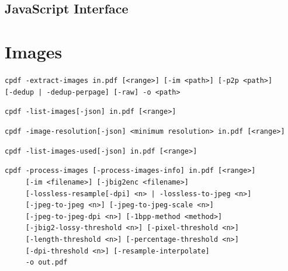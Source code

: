 \documentclass{book}
\begin{document}
\begin{jscpdflib}
\clearpage
\section*{JavaScript Interface}
\begin{small}\tt

\end{small}
\end{jscpdflib}

\chapter{Images}\label{chap:13}
\begin{framed}
\noindent\small\verb!cpdf -extract-images in.pdf [<range>] [-im <path>] [-p2p <path>]!
\noindent\small\verb!     [-dedup | -dedup-perpage] [-raw] -o <path>!

\vspace{1.5mm}
\noindent\small\verb!cpdf -list-images[-json] in.pdf [<range>]!

\vspace{1.5mm}
\noindent\small\verb!cpdf -image-resolution[-json] <minimum resolution> in.pdf [<range>]!

\vspace{1.5mm}
\noindent\small\verb!cpdf -list-images-used[-json] in.pdf [<range>]!

\vspace{1.5mm}
\noindent\small\verb!cpdf -process-images [-process-images-info] in.pdf [<range>]!\\
\noindent\small\verb!     [-im <filename>] [-jbig2enc <filename>]!\\
\noindent\small\verb!     [-lossless-resample[-dpi] <n> | -lossless-to-jpeg <n>]!\\
\noindent\small\verb!     [-jpeg-to-jpeg <n>] [-jpeg-to-jpeg-scale <n>]!\\
\noindent\small\verb!     [-jpeg-to-jpeg-dpi <n>] [-1bpp-method <method>]!\\
\noindent\small\verb!     [-jbig2-lossy-threshold <n>] [-pixel-threshold <n>]!\\
\noindent\small\verb!     [-length-threshold <n>] [-percentage-threshold <n>]!\\
\noindent\small\verb!     [-dpi-threshold <n>] [-resample-interpolate]!\\
\noindent\small\verb!     -o out.pdf!

\vspace{1.5mm}


\end{framed}
\end{document}
